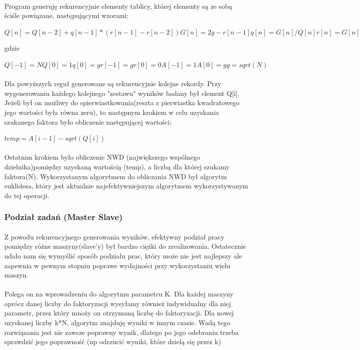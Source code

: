 \documentclass{article}
\begin{document}
\paragraph{}Program generuję rekurencyjnie elementy tablicy, której elementy są ze sobą ściśle powiązane, następującymi wzorami:

$Q[n] = Q[n-2] + q[n-1] * (r[n-1] - r[n-2]) G[n] = 2g - r[n-1] q[n] = G[n]/Q[n] r[n] = G[n] - q[n]Q[n] A[n] = q[n]*A[n-1] + A[n-2]modN$

gdzie

$Q[-1]= N Q[0] = 1 q[0] = g r[-1] = g r[0] = 0 A[-1]= 1 A[0] = g g = sqrt(N)$
\paragraph{}Dla powyższych reguł generowane są rekurencyjnie kolejne rekordy. Przy wygenerowaniu każdego kolejnego "zestawu" wyników badany był element Q[i]. Jeżeli był on możliwy do spierwiastkowania(reszta z pierwiastka kwadratowego jego wartości była równa zeru), to następnym krokiem w celu uzyskania szukanego faktora było obliczenie następującej wartości:

$temp = A[i-1] - sqrt(Q[i])$

\paragraph{}Ostatnim krokiem było obliczenie NWD (największego wspólnego dzielnika)pomiędzy uzyskaną wartością (temp), a liczbą dla której szukamy faktora(N). Wykorzystanym algorytmem do obliczania NWD był algorytm euklidesa, który jest aktualnie najefektywniejszym algorytmem wykorzystywanym do tej operacji.

\subsubsection{Podział zadań (Master Slave)}

\paragraph{}Z powodu rekurencyjnego generowania wyników, efektywny podział pracy pomiędzy różne maszyny(slave'y) był bardzo ciężki do zrealizowania. Ostatecznie udało nam się wymyślić sposób podziału prac, który może nie jest najlepszy ale zapewnia w pewnym stopniu poprawe wydajności przy wykorzystaniu wielu maszyn.

\paragraph{}Polega on na wprowadzeniu do algorytmu parametru K. Dla każdej maszyny oprócz danej liczby do faktoryzacji wysyłamy również indywidualny dla niej parametr, przez który mnoży on otrzymaną liczbę do faktoryzacji. Dla nowej uzyskanej liczby k*N, algorytm znajduję wyniki w innym czasie. Wadą tego rozwiązania jest nie zawsze poprawny wynik, dlatego po jego odebraniu trzeba sprawdzić jego poprawność (np odrzucić wyniki, które dzielą się przez k)
\end{document}
